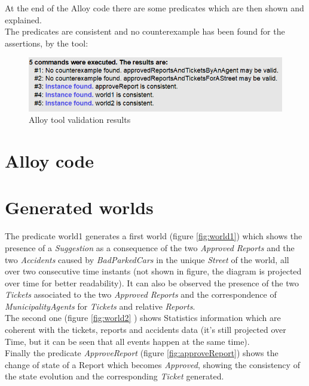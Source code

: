 \documentclass[a4paper]{report}
\begin{document}
At the end of the Alloy code there are some predicates which are then shown and explained.\\
The predicates are consistent and no counterexample has been found for the assertions, by the tool:
\begin{figure}[hp]
\includegraphics[width=\textwidth]{alloyResults}
\caption{Alloy tool validation results}
\label{fig:alloyResults}
\end{figure}

\section{Alloy code}


\section{Generated worlds}
The predicate world1 generates a first world (figure \ref{fig:world1}) which shows the presence of a \textit{Suggestion} as a consequence of the two \textit{Approved} \textit{Reports} and the two \textit{Accidents} caused by \textit{BadParkedCars} in the unique \textit{Street} of the world, all over two consecutive time instants (not shown in figure, the diagram is projected over time for better readability). It can also be observed the presence of the two \textit{Tickets} associated to the two \textit{Approved Reports} and the correspondence of \textit{MunicipalityAgents} for \textit{Tickets} and relative \textit{Reports}.\\
The second one (figure \ref{fig:world2} ) shows Statistics information which are coherent with the tickets, reports and accidents data (it's still projected over Time, but it can be seen that all events happen at the same time). \\
Finally the predicate \textit{ApproveReport} (figure \ref{fig:approveReport}) shows the change of state of a Report which becomes \textit{Approved}, showing the consistency of the state evolution and the corresponding \textit{Ticket} generated.
\end{document}
